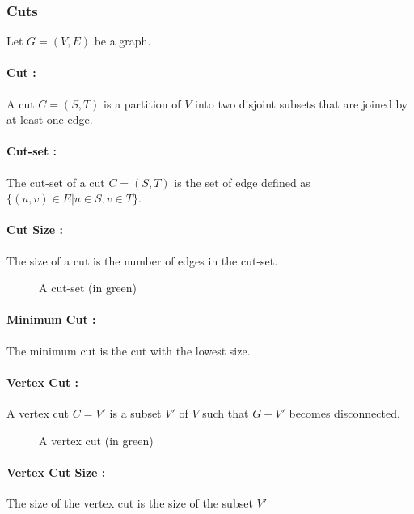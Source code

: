 \subsubsection{Cuts}
Let $G=(V,E)$ be a graph.
\paragraph{Cut :}
A cut $C=(S,T)$ is a partition of $V$ into two disjoint subsets that are joined by at least one edge.

\paragraph{Cut-set :}
The cut-set of a cut $C=(S,T)$ is the set of edge defined as $\{(u,v)\in E | u\in S, v \in T\}$.

\paragraph{Cut Size :}
The size of a cut is the number of edges in the cut-set.

\begin{figure}[!h]
  \begin{center}
    
  \end{center}
  \caption{A cut-set (in green)}
\end{figure}

\paragraph{Minimum Cut :} 
The minimum cut is the cut with the lowest size. 

\paragraph{Vertex Cut :}
A vertex cut $C=V'$ is a subset $V'$ of $V$ such that $G-V'$ becomes
disconnected.

\begin{figure}[!h]
  \begin{center}
    
  \end{center}
  \caption{A vertex cut (in green)}
\end{figure}


\paragraph{Vertex Cut Size :}
The size of the  vertex cut is the size of the subset $V'$

